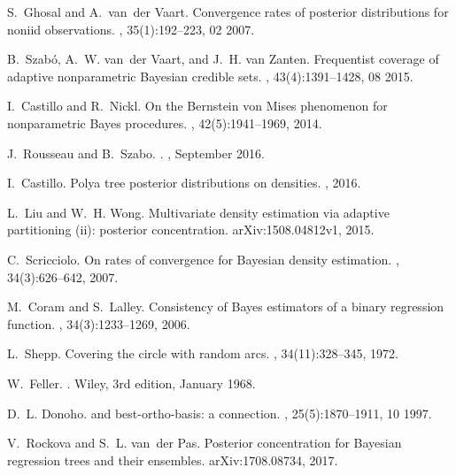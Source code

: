 \documentclass{article}
\newcommand{\1}{\mathbb{I}}
\theoremstyle{assumption}
\begin{document}
\begin{thebibliography}{10}
S.~Ghosal and A.~van~der Vaart.
\newblock Convergence rates of posterior distributions for noniid observations.
, 35(1):192--223, 02 2007.

B.~Szab\'o, A.~W. van~der Vaart, and J.~H. van Zanten.
\newblock Frequentist coverage of adaptive nonparametric {B}ayesian credible
  sets.
, 43(4):1391--1428, 08 2015.

I.~Castillo and R.~Nickl.
\newblock On the {B}ernstein von {M}ises phenomenon for nonparametric {B}ayes
  procedures.
, 42(5):1941--1969, 2014.

J.~{Rousseau} and B.~{Szabo}.
.
, September 2016.

I.~Castillo.
\newblock Polya tree posterior distributions on densities.
, 2016.

L.~Liu and W.~H. Wong.
\newblock Multivariate density estimation via adaptive partitioning (ii):
  posterior concentration.
\newblock arXiv:1508.04812v1, 2015.

C.~Scricciolo.
\newblock On rates of convergence for {B}ayesian density estimation.
, 34(3):626--642, 2007.

M.~Coram and S.~Lalley.
\newblock Consistency of {B}ayes estimators of a binary regression function.
, 34(3):1233--1269, 2006.

L.~Shepp.
\newblock Covering the circle with random arcs.
, 34(11):328--345, 1972.

W.~Feller.
.
\newblock Wiley, 3rd edition, January 1968.

D.~L. Donoho.
 and best-ortho-basis: a connection.
, 25(5):1870--1911, 10 1997.

V.~Rockova and S.~L. van~der Pas.
\newblock Posterior concentration for {B}ayesian regression trees and their
  ensembles.
\newblock arXiv:1708.08734, 2017.


\end{thebibliography}
\end{document}

